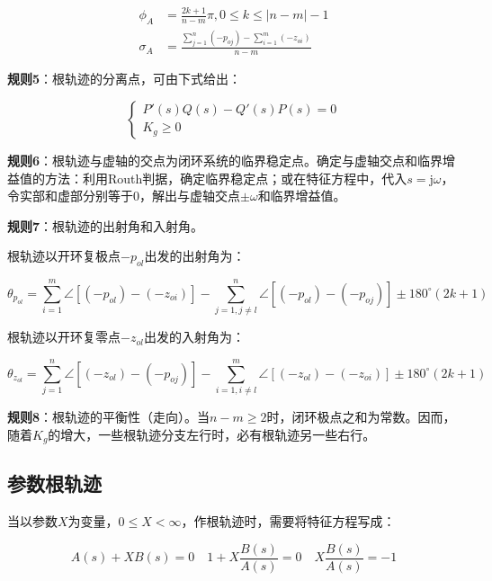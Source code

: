 \documentclass[cn, blue, normal, 12pt]{elegantnote}
\begin{document}
\begin{equation}
    \begin{aligned}
        \phi_A&=\frac{2k+1}{n-m}\pi, 0\leq k\leq |n-m|-1 \\
        \sigma_A&=\frac{\sum\limits_{j=1}^{n}(-p_{oj})-\sum\limits_{i=1}^{m}(-z_{oi})}{n-m}
    \end{aligned}
\end{equation}

\textbf{规则5}：根轨迹的分离点，可由下式给出：

\begin{equation}
    \left\{
        \begin{array}{l}
            P'(s)Q(s)-Q'(s)P(s)=0 \\
            K_g\geq 0
        \end{array}
    \right.
\end{equation}

\textbf{规则6}：根轨迹与虚轴的交点为闭环系统的临界稳定点。确定与虚轴交点和临界增益值的方法：利用Routh判据，确定临界稳定点；或在特征方程中，代入$s=\mathrm{j}\omega$，令实部和虚部分别等于0，解出与虚轴交点$±\omega$和临界增益值。

\textbf{规则7}：根轨迹的出射角和入射角。

根轨迹以开环复极点$-p_{ol}$出发的出射角为：

\begin{equation}
    \theta_{p_{ol}}=\sum_{i=1}^{m}\angle[(-p_{ol})-(-z_{oi})]-\sum_{j=1,j\neq l}^{n}\angle[(-p_{ol})-(-p_{oj})]\pm 180^{\circ}(2k+1)
\end{equation}

根轨迹以开环复零点$-z_{ol}$出发的入射角为：

\begin{equation}
    \theta_{z_{ol}}=\sum_{j=1}^{n}\angle[(-z_{ol})-(-p_{oj})]-\sum_{i=1,i\neq l}^{m}\angle[(-z_{ol})-(-z_{oi})]\pm 180^{\circ}(2k+1)
\end{equation}

\textbf{规则8}：根轨迹的平衡性（走向）。当$n-m\geq 2$时，闭环极点之和为常数。因而，随着$K_g$的增大，一些根轨迹分支左行时，必有根轨迹另一些右行。

\subsection{参数根轨迹}

当以参数$X$为变量，$0\leq X<\infty$，作根轨迹时，需要将特征方程写成：

\begin{equation}
    A(s)+XB(s)=0 \quad 1+X\frac{B(s)}{A(s)}=0 \quad X\frac{B(s)}{A(s)}=-1
\end{equation}
\end{document}
